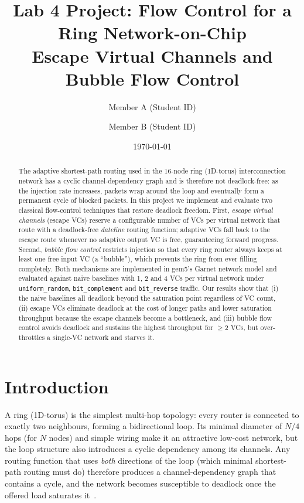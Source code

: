 \documentclass[11pt,a4paper]{article}
\title{\textbf{Lab 4 Project: Flow Control for a Ring Network-on-Chip}\\
       \large Escape Virtual Channels and Bubble Flow Control}
\author{Member A (Student ID) \and Member B (Student ID)}
\date{\today}
\begin{document}
\maketitle

\begin{abstract}
The adaptive shortest-path routing used in the 16-node ring (1D-torus)
interconnection network has a cyclic channel-dependency graph and is therefore
not deadlock-free: as the injection rate increases, packets wrap around the
loop and eventually form a permanent cycle of blocked packets.  In this
project we implement and evaluate two classical flow-control techniques that
restore deadlock freedom.  First, \emph{escape virtual channels} (escape VCs)
reserve a configurable number of VCs per virtual network that route with a
deadlock-free \emph{dateline} routing function; adaptive VCs fall back to the
escape route whenever no adaptive output VC is free, guaranteeing forward
progress.  Second, \emph{bubble flow control} restricts injection so that every
ring router always keeps at least one free input VC (a ``bubble''), which
prevents the ring from ever filling completely.  Both mechanisms are
implemented in gem5's Garnet network model and evaluated against naive
baselines with 1, 2 and 4 VCs per virtual network under
\texttt{uniform\_random}, \texttt{bit\_complement} and \texttt{bit\_reverse}
traffic.  Our results show that (i) the naive baselines all deadlock beyond
the saturation point regardless of VC count, (ii) escape VCs eliminate
deadlock at the cost of longer paths and lower saturation throughput because
the escape channels become a bottleneck, and (iii) bubble flow control avoids
deadlock and sustains the highest throughput for $\geq 2$ VCs, but over-throttles
a single-VC network and starves it.
\end{abstract}

\section{Introduction}
\label{sec:intro}

A ring (1D-torus) is the simplest multi-hop topology: every router is connected
to exactly two neighbours, forming a bidirectional loop.  Its minimal diameter
of $N/4$ hops (for $N$ nodes) and simple wiring make it an attractive
low-cost network, but the loop structure also introduces a cyclic dependency
among its channels.  Any routing function that uses \emph{both} directions of
the loop (which minimal shortest-path routing must do) therefore produces a
channel-dependency graph that contains a cycle, and the network becomes
susceptible to deadlock once the offered load saturates it~\cite{dally1987deadlock}.
\end{document}

